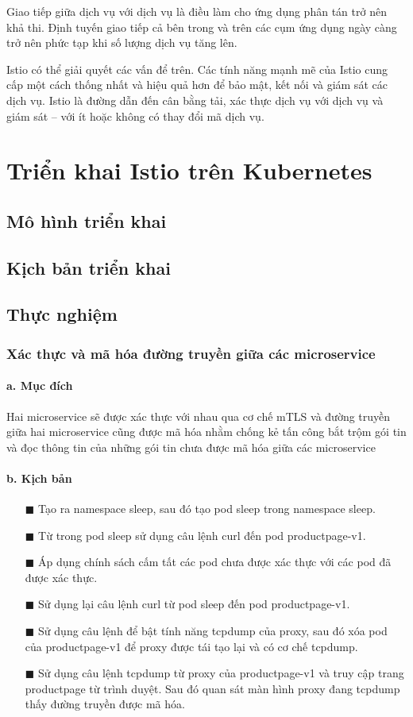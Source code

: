\documentclass[12pt,a4paper]{report}
\begin{document}
{{		Giao tiếp giữa dịch vụ với dịch vụ là điều làm cho ứng dụng phân tán trở nên khả thi. Định tuyến giao tiếp cả bên trong và trên các cụm ứng dụng ngày càng trở nên phức tạp khi số lượng dịch vụ tăng lên.
		
		Istio có thể giải quyết các vấn để trên. Các tính năng mạnh mẽ của Istio cung cấp một cách thống nhất và hiệu quả hơn để bảo mật, kết nối và giám sát các dịch vụ. Istio là đường dẫn đến cân bằng tải, xác thực dịch vụ với dịch vụ và giám sát – với ít hoặc không có thay đổi mã dịch vụ.
		
\chapter{Triển khai Istio trên Kubernetes}
	\section{Mô hình triển khai}
	\section{Kịch bản triển khai}
	\section{Thực nghiệm}
		\subsection{Xác thực và mã hóa đường truyền giữa các microservice}
			\subsubsection{a. Mục đích}
				{\hspace{0.6cm}Hai microservice sẽ được xác thực với nhau qua cơ chế mTLS và đường truyền giữa hai microservice cũng được mã hóa nhằm chống kẻ tấn công bắt trộm gói tin và đọc thông tin của những gói tin chưa được mã hóa giữa các microservice}
			\subsubsection{b. Kịch bản}
				\begin{enumerate}
					\item[$\blacksquare$] Tạo ra namespace sleep, sau đó tạo pod sleep trong namespace sleep.
					\item[$\blacksquare$] Từ trong pod sleep sử dụng câu lệnh curl đến pod productpage-v1.
					\item[$\blacksquare$] Áp dụng chính sách cấm tất các pod chưa được xác thực với các pod đã được xác thực.
					\item[$\blacksquare$] Sử dụng lại câu lệnh curl từ pod sleep đến pod productpage-v1.
					\item[$\blacksquare$] Sử dụng câu lệnh để bật tính năng tcpdump của proxy, sau đó xóa pod của productpage-v1 để proxy được tái tạo lại và có cơ chế tcpdump.
					\item[$\blacksquare$] Sử dụng câu lệnh tcpdump từ proxy của productpage-v1 và truy cập trang productpage từ trình duyệt. Sau đó quan sát màn hình proxy đang tcpdump thấy đường truyền được mã hóa. 
				\end{enumerate}
}}
\end{document}
